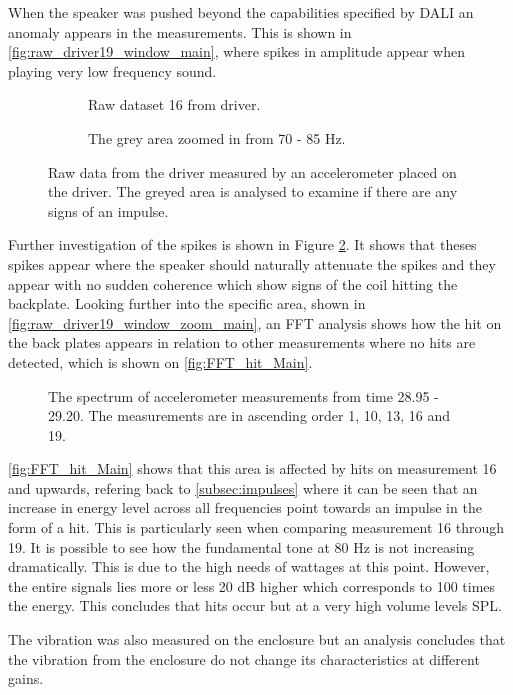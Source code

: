 When the speaker was pushed beyond the capabilities specified by DALI an anomaly appears in the measurements. This is shown in \autoref{fig:raw_driver19_window_main}, where spikes in amplitude appear when playing very low frequency sound. 

\begin{figure}[H]
\centering
\begin{subfigure}[t]{0.55\textwidth}
	
	\caption{Raw dataset 16 from driver.}
	\label{fig:raw_driver19_window_main}
\end{subfigure}
\begin{subfigure}[t]{0.43\textwidth}
	
	\caption{The grey area zoomed in from 70 - 85 Hz.}
	\label{fig:raw_driver19_window_zoom_main}
\end{subfigure}
\caption{Raw data from the driver measured by an accelerometer placed on the driver. The greyed area is analysed to examine if there are any signs of an impulse.}
\label{fig:raw_driver19_windows_main}
\end{figure}

Further investigation of the spikes is shown in Figure \ref{fig:raw_driver19_window_zoom_main}. It shows that theses spikes appear where the speaker should naturally attenuate the spikes and they appear with no sudden coherence which show signs of the coil hitting the backplate. Looking further into the specific area, shown in \autoref{fig:raw_driver19_window_zoom_main}, an FFT analysis shows how the hit on the back plates appears in relation to other measurements where no hits are detected, which is shown on \autoref{fig:FFT_hit_Main}.

\begin{figure}[H]
\centering
{}

\caption{The spectrum of accelerometer measurements from time 28.95 - 29.20. The measurements are in ascending order 1, 10, 13, 16 and 19.}
\label{fig:FFT_hit_Main}
\end{figure}

\autoref{fig:FFT_hit_Main} shows that this area is affected by hits on measurement 16 and upwards, refering back to \autoref{subsec:impulses} where it can be seen that an increase in energy level across all frequencies point towards an impulse in the form of a hit. This is particularly seen when comparing measurement 16 through 19. It is possible to see how the fundamental tone at 80 Hz is not increasing dramatically. This is due to the high needs of wattages at this point. However, the entire signals lies more or less 20 dB higher which corresponds to 100 times the energy. This concludes that hits occur but at a very high volume levels \gls{SPL}.

The vibration was also measured on the enclosure but an analysis concludes that the vibration from the enclosure do not change its characteristics at different gains.





